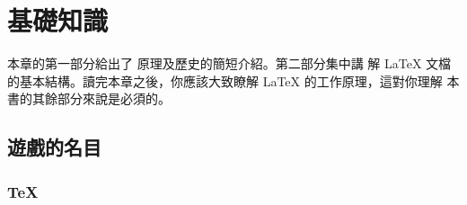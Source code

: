 \chapter{基礎知識}
\begin{intro}
本章的第一部分給出了 \LaTeXe{} 原理及歷史的簡短介紹。第二部分集中講
解 \LaTeX{} 文檔的基本結構。讀完本章之後，你應該大致瞭解 \LaTeX{} 的工作原理，這對你理解
本書的其餘部分來說是必須的。
\end{intro}

\section{遊戲的名目}
\subsection{\TeX}


